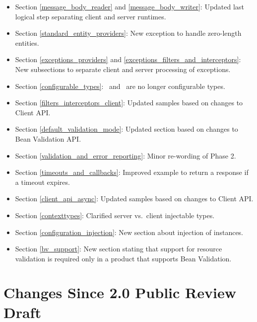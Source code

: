 \begin{itemize}
\item Section \ref{message_body_reader} and \ref{message_body_writer}: Updated last logical step separating client and server runtimes.
\item Section \ref{standard_entity_providers}: New exception  to handle zero-length entities. 
\item Section \ref{exceptions_providers} and \ref{exceptions_filters_and_interceptors}: New subsections to separate client and server processing of exceptions.
\item Section \ref{configurable_types}: \Invocation\ and \InvocationBuilder\ are no longer configurable types.
\item Section \ref{filters_interceptors_client}: Updated samples based on changes to Client API.
\item Section \ref{default_validation_mode}: Updated section based on changes to Bean Validation API.
\item Section \ref{validation_and_error_reporting}: Minor re-wording of Phase 2. 
\item Section \ref{timeouts_and_callbacks}: Improved example to return a response if a timeout expires.
\item Section \ref{client_api_async}: Updated samples based on changes to Client API.
\item Section \ref{contexttypes}: Clarified server vs.~client injectable types.
\item Section \ref{configuration_injection}: New section about injection of  instances.
\item Section \ref{bv_support}: New section stating that support for resource validation is required only in a product that supports Bean Validation.
\end{itemize}

\section{Changes Since 2.0 Public Review Draft}

